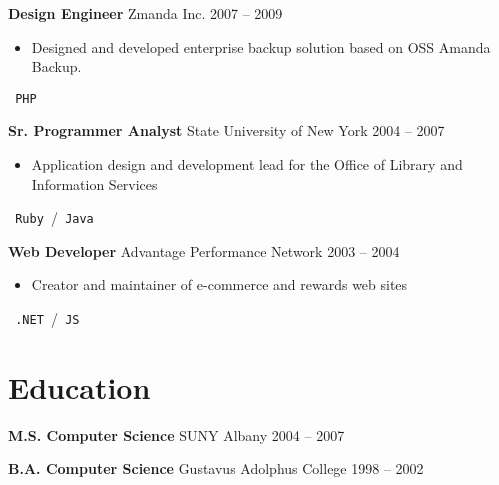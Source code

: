 \documentclass{res}
\begin{document}
        {\bf Design Engineer} \hfill Zmanda Inc. \hfill 2007 -- 2009
        \begin{itemize}
        \item Designed and developed enterprise backup solution based on OSS Amanda Backup.
        \end{itemize}
        \texttt{ PHP }
        
        {\bf Sr. Programmer Analyst} \hfill State University of New York \hfill 2004 -- 2007
        \begin{itemize}
        \item Application design and development lead for the Office of Library and Information Services
        \end{itemize}
        \texttt{ Ruby }\slash\texttt{ Java }
          
        {\bf Web Developer} \hfill Advantage Performance Network \hfill 2003 -- 2004
        \begin{itemize}
        \item Creator and maintainer of e-commerce and rewards web sites
        \end{itemize}
        \texttt{ .NET }\slash\texttt{ JS }
        

\section{Education}
        {\bf M.S. Computer Science} \hfill SUNY Albany \hfill 2004 -- 2007
        
        {\bf B.A. Computer Science} \hfill Gustavus Adolphus College \hfill 1998 -- 2002
        
        
\end{document}
